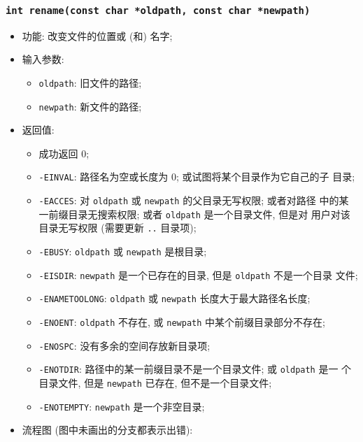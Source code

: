 \documentclass[nofonts]{ctexart}
\begin{document}
  \subsubsection[\texttt{rename}]{\texttt{int rename(const char *oldpath, const char *newpath)}}
  \begin{itemize}
\item
  功能: 改变文件的位置或 (和) 名字;
\item
  输入参数:

  \begin{itemize}
  \item
    \texttt{oldpath}: 旧文件的路径;
  \item
    \texttt{newpath}: 新文件的路径;
  \end{itemize}
\item
  返回值:

  \begin{itemize}
  \item
    成功返回 0;
  \item
    \texttt{-EINVAL}: 路径名为空或长度为 0;
    或试图将某个目录作为它自己的子 目录;
  \item
    \texttt{-EACCES}: 对 \texttt{oldpath} 或 \texttt{newpath}
    的父目录无写权限; 或者对路径 中的某一前缀目录无搜索权限; 或者
    \texttt{oldpath} 是一个目录文件, 但是对 用户对该目录无写权限
    (需要更新 \texttt{..} 目录项);
  \item
    \texttt{-EBUSY}: \texttt{oldpath} 或 \texttt{newpath} 是根目录;
  \item
    \texttt{-EISDIR}: \texttt{newpath} 是一个已存在的目录, 但是
    \texttt{oldpath} 不是一个目录 文件;
  \item
    \texttt{-ENAMETOOLONG}: \texttt{oldpath} 或 \texttt{newpath}
    长度大于最大路径名长度;
  \item
    \texttt{-ENOENT}: \texttt{oldpath} 不存在, 或 \texttt{newpath}
    中某个前缀目录部分不存在;
  \item
    \texttt{-ENOSPC}: 没有多余的空间存放新目录项;
  \item
    \texttt{-ENOTDIR}: 路径中的某一前缀目录不是一个目录文件; 或
    \texttt{oldpath} 是一 个目录文件, 但是 \texttt{newpath} 已存在,
    但不是一个目录文件;
  \item
    \texttt{-ENOTEMPTY}: \texttt{newpath} 是一个非空目录;
  \end{itemize}
\item
  流程图
  (图中未画出的分支都表示出错):


\end{itemize}
\end{document}
